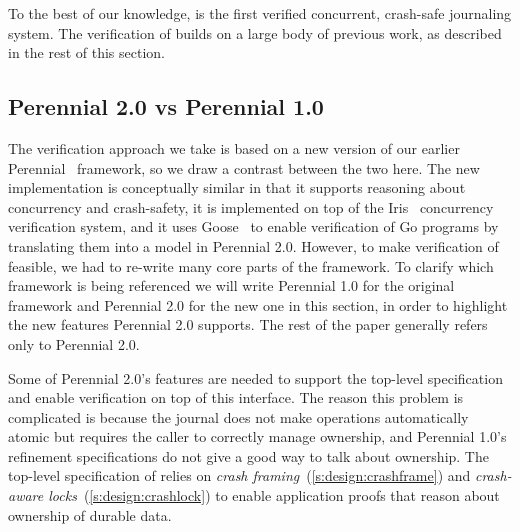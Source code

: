 To the best of our knowledge, \txn is the first verified concurrent,
crash-safe journaling system. The verification of \txn builds on a
large body of previous work, as described in the rest of this
section.

\subsection{Perennial 2.0 vs Perennial 1.0}

The verification approach we take is based on a new version of our earlier
Perennial~\cite{chajed:perennial} framework, so we draw a contrast between the
two here. The new implementation is
conceptually similar in that it supports reasoning about concurrency and
crash-safety, it is implemented on top of the
Iris~\citep{jung:iris-jfp,jung:iris-1} concurrency verification system,
and it uses Goose~\cite{chajed:goose-coqpl} to enable verification of Go
programs by translating them into a model in Perennial 2.0.
However, to make verification of \txn feasible, we had to re-write many core parts of the framework.
To clarify which framework is being referenced we will write Perennial 1.0 for the
original framework and Perennial 2.0 for the new one in this section, in order
to highlight the new features Perennial 2.0 supports. The rest of the paper
generally refers only to Perennial 2.0.




Some of Perennial 2.0's features are needed to support the \txn top-level
specification and enable verification on top of this interface. The reason this
problem is complicated is because the journal does not make operations
automatically atomic but requires the caller to correctly manage ownership, and
Perennial 1.0's refinement specifications do not give a good way to talk about
ownership. The top-level specification of \txn relies on \emph{crash
framing}~(\autoref{s:design:crashframe}) and \emph{crash-aware
locks}~(\autoref{s:design:crashlock}) to enable application proofs that reason
about ownership of durable data.


